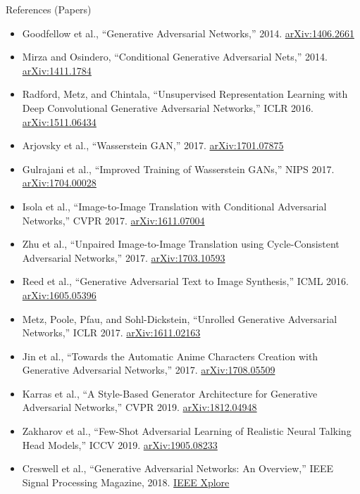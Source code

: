 \begin{frame}[allowframebreaks]{References (Papers)}

\begin{itemize}
    \item Goodfellow et al., ``Generative Adversarial Networks,'' 2014. \href{https://arxiv.org/abs/1406.2661}{arXiv:1406.2661}
    \item Mirza and Osindero, ``Conditional Generative Adversarial Nets,'' 2014. \href{https://arxiv.org/abs/1411.1784}{arXiv:1411.1784}
    \item Radford, Metz, and Chintala, ``Unsupervised Representation Learning with Deep Convolutional Generative Adversarial Networks,'' ICLR 2016. \href{https://arxiv.org/abs/1511.06434}{arXiv:1511.06434}
    \item Arjovsky et al., ``Wasserstein GAN,'' 2017. \href{https://arxiv.org/abs/1701.07875}{arXiv:1701.07875}
    \item Gulrajani et al., ``Improved Training of Wasserstein GANs,'' NIPS 2017. \href{https://arxiv.org/abs/1704.00028}{arXiv:1704.00028}
    \item Isola et al., ``Image-to-Image Translation with Conditional Adversarial Networks,'' CVPR 2017. \href{https://arxiv.org/abs/1611.07004}{arXiv:1611.07004}
    \item Zhu et al., ``Unpaired Image-to-Image Translation using Cycle-Consistent Adversarial Networks,'' 2017. \href{https://arxiv.org/abs/1703.10593}{arXiv:1703.10593}
    \item Reed et al., ``Generative Adversarial Text to Image Synthesis,'' ICML 2016. \href{https://arxiv.org/abs/1605.05396}{arXiv:1605.05396}
    \item Metz, Poole, Pfau, and Sohl-Dickstein, ``Unrolled Generative Adversarial Networks,'' ICLR 2017. \href{https://arxiv.org/abs/1611.02163}{arXiv:1611.02163}
    \item Jin et al., ``Towards the Automatic Anime Characters Creation with Generative Adversarial Networks,'' 2017. \href{https://arxiv.org/abs/1708.05509}{arXiv:1708.05509}
    \item Karras et al., ``A Style-Based Generator Architecture for Generative Adversarial Networks,'' CVPR 2019. \href{https://arxiv.org/abs/1812.04948}{arXiv:1812.04948}
    \item Zakharov et al., ``Few-Shot Adversarial Learning of Realistic Neural Talking Head Models,'' ICCV 2019. \href{https://arxiv.org/abs/1905.08233}{arXiv:1905.08233}
    \item Creswell et al., ``Generative Adversarial Networks: An Overview,'' IEEE Signal Processing Magazine, 2018. \href{https://ieeexplore.ieee.org/document/8280743}{IEEE Xplore}
\end{itemize}

\end{frame}